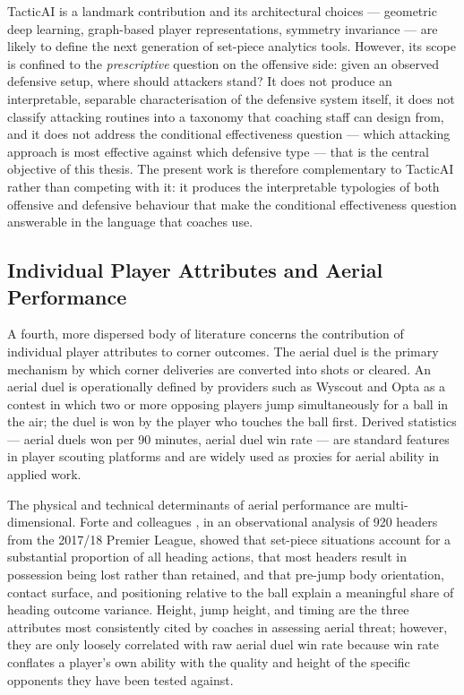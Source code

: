 TacticAI is a landmark contribution and its architectural choices --- geometric
deep learning, graph-based player representations, symmetry invariance --- are
likely to define the next generation of set-piece analytics tools. However, its
scope is confined to the \emph{prescriptive} question on the offensive side:
given an observed defensive setup, where should attackers stand? It does not
produce an interpretable, separable characterisation of the defensive system
itself, it does not classify attacking routines into a taxonomy that coaching
staff can design from, and it does not address the conditional effectiveness
question --- which attacking approach is most effective against which defensive
type --- that is the central objective of this thesis. The present work is
therefore complementary to TacticAI rather than competing with it: it produces
the interpretable typologies of both offensive and defensive behaviour that make
the conditional effectiveness question answerable in the language that coaches
use.

\subsection{Individual Player Attributes and Aerial Performance}
\label{sec:lit_players}

A fourth, more dispersed body of literature concerns the contribution of
individual player attributes to corner outcomes. The aerial duel is the primary
mechanism by which corner deliveries are converted into shots or cleared. An
aerial duel is operationally defined by providers such as Wyscout and Opta as a
contest in which two or more opposing players jump simultaneously for a ball in
the air; the duel is won by the player who touches the ball first. Derived
statistics --- aerial duels won per 90 minutes, aerial duel win rate --- are
standard features in player scouting platforms and are widely used as proxies
for aerial ability in applied work.

The physical and technical determinants of aerial performance are multi-dimensional.
Forte and colleagues \cite{Forte2019}, in an observational analysis of
920 headers from the 2017/18 Premier League, showed that set-piece situations
account for a substantial proportion of all heading actions, that most headers
result in possession being lost rather than retained, and that pre-jump body
orientation, contact surface, and positioning relative to the ball explain a
meaningful share of heading outcome variance. Height, jump height, and timing
are the three attributes most consistently cited by coaches in assessing aerial
threat; however, they are only loosely correlated with raw aerial duel win rate
because win rate conflates a player's own ability with the quality and height of
the specific opponents they have been tested against.


